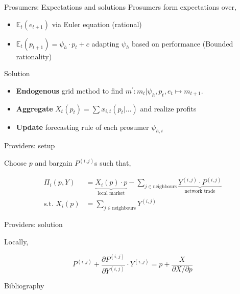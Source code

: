 \documentclass[xcolor={svgnames}]{beamer}
\newcommand{\E}{\mathbb{E}}
\begin{document}
\begin{frame}{Prosumers: Expectations and solutions}
    Prosumers form expectations over,

    \begin{itemize} \setlength{\itemsep}{1em}
        \item $\E_t(e_{t+1})$ via Euler equation (rational)
        \item $\E_t(p_{t+1}) = \psi_h \cdot p_t + c$ adapting $\psi_h$ based on performance (Bounded rationality)
    \end{itemize}

    Solution

    \begin{itemize} \setlength{\itemsep}{1em}
        \item \textbf{Endogenous} grid method to find $m^\prime: m_t \vert \psi_h, p_t, e_t \mapsto m_{t+1}$.
        \item \textbf{Aggregate} $X_t(p_t) = \sum x_{i, t}(p_t \vert \ldots)$ and realize profits
        \item \textbf{Update} forecasting rule of each prosumer $\psi_{h, i}$
    \end{itemize}
\end{frame}

\begin{frame}{Providers: setup}

    Choose $p$ and bargain $P^{(i, j)}$s such that,

    \begin{equation*}
        \begin{split}
            \Pi_i\left(p, Y\right) &= \underbrace{X_i(p) \cdot p}_{\text{local market}} - \sum_{j \in \text{neighbours}} \underbrace{Y^{(i, j)} \cdot P^{(i, j)}}_{\text{network trade}} \\
            \text{s.t. } X_i(p) &=\sum_{j \in \text{neighbours}} Y^{(i, j)}
        \end{split}
    \end{equation*}
\end{frame}


\begin{frame}{Providers: solution}

    Locally,

    \begin{equation*}
        P^{(i, j)}+ \frac{\partial P^{(i, j)}}{\partial Y^{(i, j)}} \cdot Y^{(i, j)} = p + \frac{X}{\partial X / \partial p}
    \end{equation*}

\end{frame}

\begin{frame}[allowframebreaks]{Bibliography}
    \nocite{*}
\end{frame}
\end{document}
